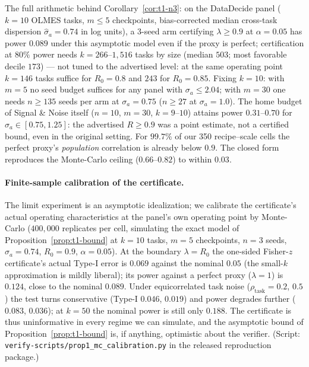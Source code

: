 The full arithmetic behind Corollary~\ref{cor:t1-n3}: on the DataDecide panel ($k = 10$ OLMES
tasks, $m \le 5$ checkpoints, bias-corrected median
cross-task dispersion $\hat\sigma_a = 0.74$ in log units), a 3-seed arm certifying $\lambda \ge 0.9$
at $\alpha = 0.05$ has power $0.089$ under this asymptotic model even if the proxy is perfect;
certification at $80\%$ power needs
$k = 266$--$1{,}516$ tasks by size (median $503$; most favorable decile $173$) ---
not tuned to the advertised level: at the same operating point $k = 146$ tasks suffice for
$R_0 = 0.8$ and $243$ for $R_0 = 0.85$. Fixing $k = 10$:
with $m = 5$ no seed budget suffices for any panel with $\sigma_a \le 2.04$; with $m = 30$ one needs
$n \ge 135$ seeds per arm at $\sigma_a = 0.75$ ($n \ge 27$ at $\sigma_a = 1.0$). The home budget of
Signal \& Noise itself ($n = 10$, $m = 30$, $k = 9$--$10$) attains power $0.31$--$0.70$ for
$\sigma_a \in [0.75, 1.25]$: the advertised $R \ge 0.9$ was a point estimate, not a certified bound,
even in the original setting. For $99.7\%$ of our 350 recipe--scale cells the perfect proxy's \emph{population}
correlation is already below $0.9$. The closed form reproduces the Monte-Carlo ceiling
($0.66$--$0.82$) to within $0.03$.

\paragraph{Finite-sample calibration of the certificate.}
\label{app:t1-mc}
The limit experiment is an asymptotic idealization; we calibrate the certificate's actual
operating characteristics at the panel's own operating point by Monte-Carlo ($400{,}000$
replicates per cell, simulating the exact model of Proposition~\ref{prop:t1-bound} at $k=10$
tasks, $m=5$ checkpoints, $n=3$ seeds, $\sigma_a = 0.74$, $R_0 = 0.9$, $\alpha = 0.05$). At the
boundary $\lambda = R_0$ the one-sided Fisher-$z$ certificate's actual Type-I error is $0.069$
against the nominal $0.05$ (the small-$k$ approximation is mildly liberal); its power against a
perfect proxy ($\lambda = 1$) is $0.124$, close to the nominal $0.089$. Under equicorrelated
task noise ($\rho_{\mathrm{task}} = 0.2$, $0.5$) the test turns conservative (Type-I
$0.046$, $0.019$) and power degrades further ($0.083$, $0.036$); at $k = 50$ the nominal power
is still only $0.188$. The certificate is thus uninformative in every regime we can simulate,
and the asymptotic bound of Proposition~\ref{prop:t1-bound} is, if anything, optimistic about
the verifier. (Script: \texttt{verify-scripts/prop1\_mc\_calibration.py} in the released
reproduction package.)

